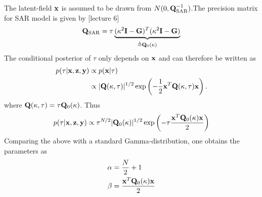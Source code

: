 \documentclass[a4paper,10pt]{article}
\def\bI{{\bf I}}
\def\bG{{\bf G}}
\def\bQ{{\bf Q}}
\def\bx{{\bf x}}
\def\by{{\bf y}}
\def\bz{{\bf z}}
\begin{document}
The latent-field $\bx$ is assumed to be drawn from $N(0,\bQ_{\mathrm{SAR}}^{-1})$.The precision matrix for SAR model is given by [lecture 6]
\begin{equation}
 \bQ_{\mathrm{SAR}} = \tau \underbrace{(\kappa^2 \bI - \bG)^T (\kappa^2 \bI - \bG)}_{\triangleq \bQ_0(\kappa)}
\end{equation}
The conditional posterior of $\tau$ only depends on $\bx$ and can therefore be written as
\begin{align}
 p(\tau|\bx,\bz,\by) &\propto p(\bx|\tau) \nonumber \\
 &\propto |\bQ(\kappa,\tau)|^{1/2} \exp \left( -\frac{1}{2} \bx^T \bQ(\kappa,\tau) \bx \right).
\end{align}
where $\bQ(\kappa,\tau) = \tau \bQ_0(\kappa)$. Thus
\begin{equation}
 p(\tau|\bx,\bz,\by) \propto \tau^{N/2} |\bQ_0(\kappa)|^{1/2}  \exp \left( - \tau \frac{\bx^T \bQ_0(\kappa) \bx}{2} \right)
\end{equation}
Comparing the above with a standard Gamma-distribution, one obtains the parameters as
\begin{align}
 \alpha &= \frac{N}{2} + 1 \nonumber  \\
 \beta &= \frac{\bx^T \bQ_0(\kappa) \bx}{2}
\end{align}
\end{document}

